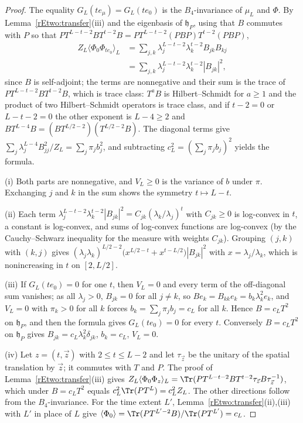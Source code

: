 \begin{proof}
The equality $G_L(te_\mu)=G_L(te_0)$ is the $B_4$-invariance of $\mu_L$
and $\Phi$. By Lemma~\ref{rEtwo:transfer}(iii) and the eigenbasis of
$\mathfrak h_P$, using that $B$ commutes with $P$ so that $PT^{L-t-2}BT^{
t-2}B=PT^{L-t-2}(PBP)T^{t-2}(PBP)$,
\begin{align*}
Z_L\langle\Phi_0\Phi_{te_0}\rangle_L&=\sum_{j,k}\lambda_j^{L-t-2}\lambda_k^{
t-2}B_{jk}B_{kj}\\
&=\sum_{j,k}\lambda_j^{L-t-2}\lambda_k^{t-2}|B_{jk}|^2 ,
\end{align*}
since $B$ is self-adjoint; the terms are nonnegative and their sum is the
trace of $PT^{L-t-2}BT^{t-2}B$, which is trace class: $T^aB$ is
Hilbert--Schmidt for $a\ge1$ and the product of two Hilbert--Schmidt
operators is trace class, and if $t-2=0$ or $L-t-2=0$ the other exponent is
$L-4\ge2$ and $BT^{L-4}B=(BT^{L/2-2})(T^{L/2-2}B)$. The diagonal terms
give $\sum_j\lambda_j^{L-4}B_{jj}^2/Z_L=\sum_j\pi_jb_j^2$, and subtracting
$c_L^2=(\sum_j\pi_jb_j)^2$ yields the formula.

(i) Both parts are nonnegative, and $V_L\ge0$ is the variance of $b$ under
$\pi$. Exchanging $j$ and $k$ in the sum shows the symmetry $t\mapsto L-t$.

(ii) Each term $\lambda_j^{L-t-2}\lambda_k^{t-2}|B_{jk}|^2=C_{jk}(\lambda_k/
\lambda_j)^t$ with $C_{jk}\ge0$ is log-convex in $t$, a constant is
log-convex, and sums of log-convex functions are log-convex (by the
Cauchy--Schwarz inequality for the measure with weights $C_{jk}$).
Grouping $(j,k)$ with $(k,j)$ gives $(\lambda_j\lambda_k)^{L/2-2}\bigl(x^{
L/2-t}+x^{t-L/2}\bigr)|B_{jk}|^2$ with $x=\lambda_j/\lambda_k$, which is
nonincreasing in $t$ on $[2,L/2]$.

(iii) If $G_L(te_0)=0$ for one $t$, then $V_L=0$ and every term of the
off-diagonal sum vanishes; as all $\lambda_j>0$, $B_{jk}=0$ for all $j\ne k$,
so $Be_k=B_{kk}e_k=b_k\lambda_k^2e_k$, and $V_L=0$ with $\pi_k>0$ for all
$k$ forces $b_k=\sum_j\pi_jb_j=c_L$ for all $k$. Hence $B=c_LT^2$ on
$\mathfrak h_P$, and then the formula gives $G_L(te_0)=0$ for every $t$.
Conversely $B=c_LT^2$ on $\mathfrak h_P$ gives $B_{jk}=c_L\lambda_k^2
\delta_{jk}$, $b_k=c_L$, $V_L=0$.

(iv) Let $z=(t,\vec z)$ with $2\le t\le L-2$ and let $\tau_{\vec z}$ be
the unitary of the spatial translation by $\vec z$; it commutes with $T$
and $P$. The proof of Lemma~\ref{rEtwo:transfer}(iii) gives $Z_L\langle
\Phi_0\Phi_z\rangle_L=\Tr(PT^{L-t-2}BT^{t-2}\tau_{\vec z}B\tau_{\vec z}^{-1})$,
which under $B=c_LT^2$ equals $c_L^2\Tr(PT^L)=c_L^2Z_L$. The other
directions follow from the $B_4$-invariance. For the time extent $L'$,
Lemma~\ref{rEtwo:transfer}(ii),(iii) with $L'$ in place of $L$ give
$\langle\Phi_0\rangle=\Tr(PT^{L'-2}B)/\Tr(PT^{L'})=c_L$.
\end{proof}

